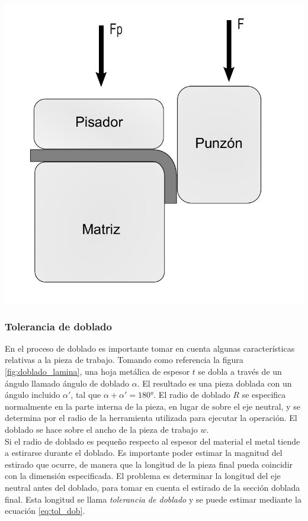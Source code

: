 \begin{center}
\includegraphics[scale=0.35]{src/ch2/doblado_bordes}
\label{fig:doblado_bordes}
\end{center}


\subsubsection{Tolerancia de doblado}

En el proceso de doblado es importante tomar en cuenta algunas características relativas a la 
pieza de trabajo. Tomando como referencia la figura \ref{fig:doblado_lamina}, una hoja metálica 
de espesor $t$ se dobla a través de un ángulo llamado ángulo de doblado $\alpha$. El  resultado 
es una pieza doblada con un ángulo incluido $\alpha'$, tal que $\alpha + \alpha' = 180°$. 
El radio de doblado $R$ se especifica normalmente en la parte interna de la pieza, en lugar de 
sobre el eje neutral, y se determina por el radio de la herramienta utilizada para ejecutar 
la operación. El doblado se hace sobre el ancho de la pieza de trabajo $w$. ~\cite{groover2007}\\

Si el radio de doblado es pequeño respecto al espesor del material el metal tiende a estirarse 
durante el doblado. Es importante poder estimar la magnitud del estirado que ocurre, de manera 
que la longitud de la pieza final pueda coincidir con la dimensión especificada. El problema 
es determinar la longitud del eje neutral antes del doblado, para tomar en cuenta el estirado 
de la sección doblada final. Esta longitud se llama \textit{tolerancia de doblado} y se puede 
estimar mediante la ecuación \ref{eq:tol_dob}.

